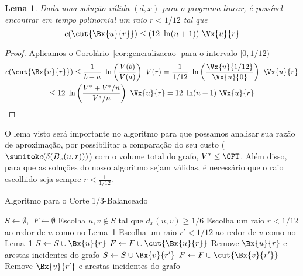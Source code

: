 \documentclass[12pt, a4paper]{article}
\newtheorem{lema}{Lema}[section]
\begin{document}
\begin{lema}
\label{lema:utilizando_generalizacao}
Dada uma solução válida $(d, x)$ para o programa linear, é possível encontrar em tempo polinomial um raio $r < 1/12$ tal que
\[
c(\cut{\Bx{u}{r}}) \leq (12\ \ln (n+1))\ \Vx{u}{r}
\]
\end{lema}
\begin{proof}
Aplicamos o Corolário~\ref{cor:generalizacao} para o intervalo $[0, 1/12)$
\begin{gather*}
    c(\cut{\Bx{u}{r}}) \leq \frac{1}{b - a}\ \ln\left(\frac{V(b)}{V(a)}\right)\ V(r)
    = \frac{1}{1/12}\ \ln\left(\frac{\Vx{u}{1/12}}{\Vx{u}{0}}\right)\ \Vx{u}{r} \\
    \leq 12\ \ln\left( \frac{V^* + V^*/n}{V^*/n} \right)\ \Vx{u}{r}
    = 12\ \ln(n+1)\ \Vx{u}{r}
\end{gather*}
\end{proof}

O lema visto será importante no algoritmo para que possamos analisar sua razão de aproximação, por possibilitar a comparação do seu custo ($\sumitok c(\delta(B_x(u, r)))$) com o volume total do grafo, $V^* \leq \OPT$. Além disso, para que as soluções do nosso algoritmo sejam válidas, é necessário que o raio escolhido seja sempre $r < \frac{1}{1/12}$.


\begin{algorithm}[htb]
\caption{Algoritmo para o Corte 1/3-Balanceado} \label{alg:balancedcut}
    \begin{algorithmic}[1]
        \State $S \gets \emptyset$, $\ F \gets \emptyset$
            \State \textrm{Escolha $u, v \notin S$ tal que $d_x(u, v) \geq 1/6$}
            \State \textrm{Escolha um raio $r < 1/12$ ao redor de $u$ como no Lema~\ref{lema:utilizando_generalizacao}}
            \State \textrm{Escolha um raio $r' < 1/12$ ao redor de $v$ como no Lema~\ref{lema:utilizando_generalizacao}}
                \State $S \gets S \cup \Bx{u}{r}$
                \State $F \gets F \cup \cut{\Bx{u}{r}}$
                \State \textrm{Remove $\Bx{u}{r}$ e arestas incidentes do grafo}
            \Else
                \State $S \gets S \cup \Bx{v}{r'}$
                \State $F \gets F \cup \cut{\Bx{v}{r'}}$
                \State \textrm{Remove $\Bx{v}{r'}$ e arestas incidentes do grafo}
            \EndIf
        \EndWhile
    \end{algorithmic}
\end{algorithm}
\end{document}
